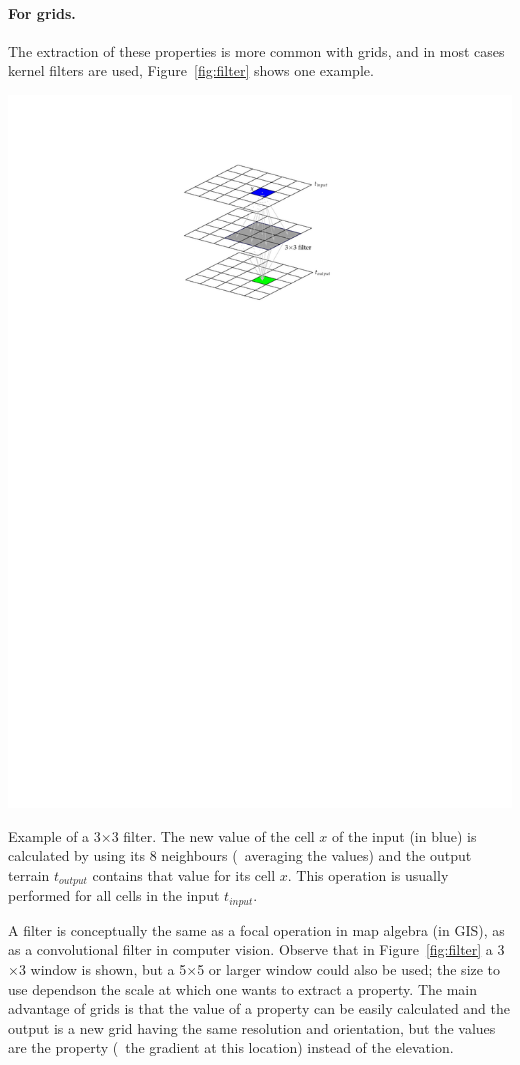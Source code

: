 \paragraph{For grids.}
The extraction of these properties is more common with grids, and in most cases kernel filters are used, Figure~\ref{fig:filter} shows one example.
\begin{marginfigure}
  \centering
  \includegraphics[width=\linewidth]{figs/filter}
  \caption{Example of a 3$\times$3 filter. The new value of the cell $x$ of the input (in blue) is calculated by using its 8 neighbours (\eg\ averaging the values) and the output terrain $t_{output}$ contains that value for its cell $x$. This operation is usually performed for all cells in the input $t_{input}$.}%
\label{fig:filter}
\end{marginfigure}%
A filter is conceptually the same as a focal operation in map algebra (in GIS), as as a convolutional filter in computer vision.
Observe that in Figure~\ref{fig:filter} a 3$\times$3 window is shown, but a 5$\times$5%
or larger window could also be used; the size to use dependson the scale at which one wants to extract a property.
The main advantage of grids is that the value of a property can be easily calculated and the output is a new grid having the same resolution and orientation, but the values are the property (\eg\ the gradient at this location) instead of the elevation.

